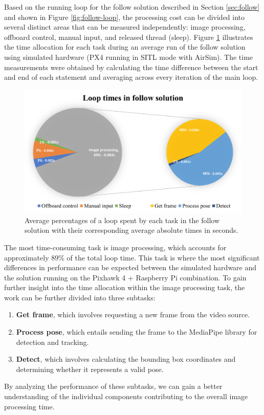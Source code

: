 Based on the running loop for the follow solution described in Section \ref{sec:follow} and shown in Figure \ref{fig:follow-loop}, the processing cost can be divided into several distinct areas that can be measured independently: image processing, offboard control, manual input, and released thread (sleep). Figure \ref{fig:perf-sitl-sim} illustrates the time allocation for each task during an average run of the follow solution using simulated hardware (PX4 running in SITL mode with AirSim). The time measurements were obtained by calculating the time difference between the start and end of each statement and averaging across every iteration of the main loop.

\begin{figure}[H]
  \centering
  \includegraphics[width=.9\textwidth, keepaspectratio]{img/sitl-performance.png}
  \caption{Average percentages of a loop spent by each task in the follow solution with their corresponding average absolute times in seconds.}
  \label{fig:perf-sitl-sim}
\end{figure}


The most time-consuming task is image processing, which accounts for approximately 89\% of the total loop time. This task is where the most significant differences in performance can be expected between the simulated hardware and the solution running on the Pixhawk 4 + Raspberry Pi combination. To gain further insight into the time allocation within the image processing task, the work can be further divided into three subtasks:
\begin{enumerate}
    \item \textbf{Get frame}, which involves requesting a new frame from the video source.
    \item \textbf{Process pose}, which entails sending the frame to the MediaPipe library for detection and tracking.
    \item \textbf{Detect}, which involves calculating the bounding box coordinates and determining whether it represents a valid pose.
\end{enumerate}
By analyzing the performance of these subtasks, we can gain a better understanding of the individual components contributing to the overall image processing time.

